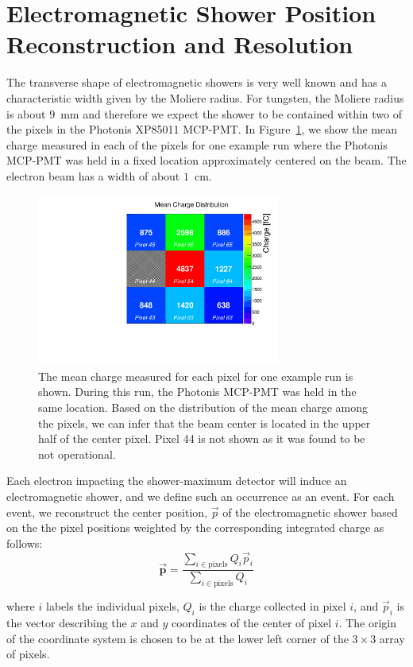 \documentclass[12pt]{article}
\begin{document}
\section{ Electromagnetic Shower Position Reconstruction and Resolution}
\label{sec:position} The transverse shape of electromagnetic showers is very
well known and has a characteristic width given by the Moliere radius. For
tungsten, the Moliere radius is about $9$~mm and therefore we expect the shower
to be contained within two of the pixels in the Photonis XP85011 MCP-PMT. In
Figure~\ref{fig:exavint}, we show the mean charge measured in each of the pixels
for one example run where the Photonis MCP-PMT was held in a fixed location
approximately centered on the beam. The electron beam has a width of about
$1$~cm. 

\begin{figure}[htbp] 
\centering
\includegraphics[width=8cm]{Images/exavint/exintrun30.pdf} 
\caption{\small The mean charge measured for each pixel for one example run is shown. During this run, the Photonis MCP-PMT was held in the same location. Based on the distribution
of the mean charge among the pixels, we can infer that the beam center is
located in the upper half of the center pixel. Pixel 44 is not shown as it was
found to be not operational. } 
\label{fig:exavint} 
\end{figure} 

Each electron impacting the shower-maximum detector will induce an
electromagnetic shower, and we define such an occurrence as an event. For each
event, we reconstruct the center position, $\vec{p}$ of the electromagnetic
shower based on the the pixel positions weighted by the corresponding integrated
charge as follows: 
\begin{equation} 
 \vec{\mathbf{{p}}} =
\frac{\sum_{i\in\mathrm{pixels}} Q_{i} \vec{p}_i} {\sum_{i\in\mathrm{pixels}}
Q_{i}} 
\end{equation} 

where $i$ labels the individual pixels, $Q_{i}$ is the charge collected in pixel
$i$, and $\vec{p}_{i}$ is the vector describing the $x$ and $y$ coordinates of
the center of pixel $i$. The origin of the coordinate system is chosen to be at
the lower left corner of the $3\times3$ array of pixels.
\end{document}
